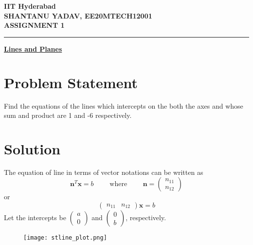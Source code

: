 \documentclass[12pt]{article}
\begin{document}
\begin{center}
	{\Large \bf IIT Hyderabad} \\ \vspace{2ex}
	{\large \bf SHANTANU YADAV, EE20MTECH12001 }\\
	\vspace{2ex}
	{\large \bf ASSIGNMENT 1} \\
\end{center}
	\hrule

\vspace{2ex}
\begin{center}
{\underline{\Large \bf Lines and Planes}}
\end{center}

\section*{Problem Statement}
Find the equations of the lines which intercepts on the both the axes and whose sum and product are 1 and -6 respectively.

\section*{Solution}
The equation of line in terms of vector notations can be written as
\begin{equation}
	{\mathbf{n}^T}{\mathbf x} = b 
	\qquad \text{ where } \qquad 
	\mathbf{n} = 
\begin{pmatrix}
	n_{11} \\ 
	n_{12}
\end{pmatrix}
\end{equation}
	or
\begin{equation}
\begin{pmatrix}
	n_{11} & n_{12}
\end{pmatrix}
	{\mathbf{x}} = b	\label{eq2}
\end{equation}
Let the intercepts be 
$\displaystyle
\begin{pmatrix}
	a \\ 0
\end{pmatrix}$
and 
$\displaystyle
\begin{pmatrix}
	0 \\ b
\end{pmatrix}$, respectively. \\


\begin{figure}


\centering
\texttt{[image: stline\_plot.png]}


\caption{}
\end{figure}
\end{document}
